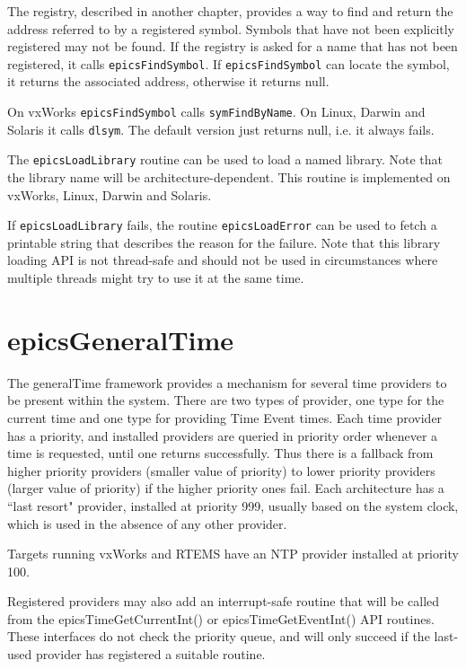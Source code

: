 The registry, described in another chapter, provides a way to find and return the address referred to by a registered symbol.
Symbols that have not been explicitly registered may not be found.
If the registry is asked for a name that has not been registered, it calls \verb|epicsFindSymbol|.
If \verb|epicsFindSymbol| can locate the symbol, it returns the associated address, otherwise it returns null.

On vxWorks \verb|epicsFindSymbol| calls \verb|symFindByName|.
On Linux, Darwin and Solaris it calls \verb|dlsym|.
The default version just returns null, i.e. it always fails.

The \verb|epicsLoadLibrary| routine can be used to load a named library.
Note that the library name will be architecture-dependent.
This routine is implemented on vxWorks, Linux, Darwin and Solaris.

If \verb|epicsLoadLibrary| fails, the routine \verb|epicsLoadError| can be used to fetch a printable string that describes the reason for the failure.
Note that this library loading API is not thread-safe and should not be used in circumstances where multiple threads might try to use it at the same time.

\section{epicsGeneralTime}

The generalTime framework provides a mechanism for several time providers to be present within the system.  There are 
two types of provider, one type for the current time and one type for providing Time Event times.  Each time provider has 
a priority, and installed providers are queried in priority order whenever a time is requested, until one returns successfully.  
Thus there is a fallback from higher priority providers (smaller value of priority) to lower priority providers (larger value 
of priority) if the higher priority ones fail.  Each architecture has a ``last resort" provider, installed at priority 999, usually 
based on the system clock, which is used in the absence of any other provider.

Targets running vxWorks and RTEMS have an NTP provider installed at priority 100.

Registered providers may also add an interrupt-safe routine that will be called from the epicsTimeGetCurrentInt() or 
epicsTimeGetEventInt()  API routines. These interfaces do not check the priority queue, and will only succeed if the last-
used provider has registered a suitable routine.

